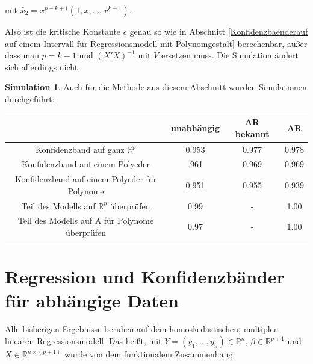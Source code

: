\documentclass[12pt,a4paper]{article}
\theoremstyle{definition}
\theoremstyle{definition}
\theoremstyle{definition}
\newtheorem{Simulation}[Definition]{Simulation}
\theoremstyle{definition}
\newcommand{\UeberRR}{0.953}
\newcommand{\UeberRMinmax}{.961}
\newcommand{\UeberRMinmaxPolyfast}{0.951}
\newcommand{\UeberARbekanntR}{0.977}
\newcommand{\UeberARbekanntMinmax}{0.969}
\newcommand{\UeberARbekanntMinmaxPolyfast}{0.955}
\newcommand{\UeberARR}{0.978}
\newcommand{\UeberARMinmax}{0.969}
\newcommand{\UeberARMinmaxPolyfast}{0.939}
\newcommand{\UeberRRpruefen}{0.99}
\newcommand{\UeberRMinmaxPolyfastpruefen}{0.97}
\newcommand{\UeberARbekanntRpruefen}{-}
\newcommand{\UeberARbekanntMinmaxPolyfastpruefen}{-}
\newcommand{\UeberARRpruefen}{1.00}
\newcommand{\UeberARMinmaxPolyfastpruefen}{1.00}
\begin{document}
mit $\tilde{x_2}= x^{p-k+1}(1, x, \ldots, x^{k-1})$.

Also ist die kritische Konstante $c$ genau so wie in Abschnitt \ref{Konfidenzbaenderauf auf einem Intervall für Regressionsmodell mit Polynomgestalt} berechenbar, außer dass man $p=k-1$ und $(X'X)^{-1}$ mit $V$ ersetzen muss. Die Simulation ändert sich allerdings nicht.

\begin{Simulation}
Auch für die Methode aus diesem Abschnitt wurden Simulationen durchgeführt:

\begin{center}
\begin{tabular}{|c|c|c|c|}
\hline 
& unabhängig & AR bekannt & AR \\ 
\hline 
Konfidenzband auf ganz $\mathbb{R}^{p}$		 & \UeberRR		  & \UeberARbekanntR & \UeberARR \\ 
\hline 
Konfidenzband auf einem Polyeder	 & \UeberRMinmax  & \UeberARbekanntMinmax & \UeberARMinmax \\ 
\hline 
Konfidenzband auf einem Polyeder für Polynome  & \UeberRMinmaxPolyfast & \UeberARbekanntMinmaxPolyfast & \UeberARMinmaxPolyfast \\ 
\hline 
Teil des Modells auf $\mathbb{R}^{p}$ überprüfen 	& \UeberRRpruefen & \UeberARbekanntRpruefen & \UeberARRpruefen \\ 
\hline 
Teil des Modells auf A für Polynome überprüfen	& \UeberRMinmaxPolyfastpruefen & \UeberARbekanntMinmaxPolyfastpruefen & \UeberARMinmaxPolyfastpruefen \\ 
\hline 
\end{tabular} 
\end{center}

\end{Simulation}





\newpage
\section{Regression und Konfidenzbänder für abhängige Daten}
\label{Regression und Konfidenzbänder für abhaengige Daten}
Alle bisherigen Ergebnisse beruhen auf dem homoskedastischen, multiplen linearen Regressionsmodell. Das heißt, mit $Y=(y_1, \ldots, y_n) \in \mathbb{R}^n$, $\beta \in \mathbb{R}^{p+1}$ und $X \in \mathbb{R}^{n \times (p+1)}$ wurde von dem funktionalem Zusammenhang
\end{document}
